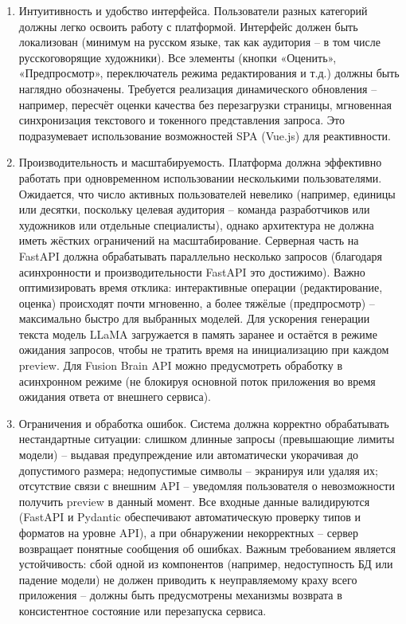 \begin{enumerate}[label=\arabic*.]
    \item Интуитивность и удобство интерфейса. Пользователи разных категорий должны легко освоить работу с платформой. Интерфейс должен быть локализован (минимум на русском языке, так как аудитория – в том числе русскоговорящие художники). Все элементы (кнопки «Оценить», «Предпросмотр», переключатель режима редактирования и т.д.) должны быть наглядно обозначены. Требуется реализация динамического обновления – например, пересчёт оценки качества без перезагрузки страницы, мгновенная синхронизация текстового и токенного представления запроса. Это подразумевает использование возможностей SPA (Vue.js) для реактивности.
    \item  Производительность и масштабируемость. Платформа должна эффективно работать при одновременном использовании несколькими пользователями. Ожидается, что число активных пользователей невелико (например, единицы или десятки, поскольку целевая аудитория – команда разработчиков или художников или отдельные специалисты), однако архитектура не должна иметь жёстких ограничений на масштабирование. Серверная часть на FastAPI должна обрабатывать параллельно несколько запросов (благодаря асинхронности и производительности FastAPI это достижимо)\cite{fastapi:practicum}. Важно оптимизировать время отклика: интерактивные операции (редактирование, оценка) происходят почти мгновенно, а более тяжёлые (предпросмотр) – максимально быстро для выбранных моделей. Для ускорения генерации текста модель LLaMA загружается в память заранее и остаётся в режиме ожидания запросов, чтобы не тратить время на инициализацию при каждом preview. Для Fusion Brain API можно предусмотреть обработку в асинхронном режиме (не блокируя основной поток приложения во время ожидания ответа от внешнего сервиса).
    \item Ограничения и обработка ошибок. Система должна корректно обрабатывать нестандартные ситуации: слишком длинные запросы (превышающие лимиты модели) – выдавая предупреждение или автоматически укорачивая до допустимого размера; недопустимые символы – экранируя или удаляя их; отсутствие связи с внешним API – уведомляя пользователя о невозможности получить preview в данный момент. Все входные данные валидируются (FastAPI и Pydantic обеспечивают автоматическую проверку типов и форматов на уровне API\cite{yandex:fastapi}), а при обнаружении некорректных – сервер возвращает понятные сообщения об ошибках. Важным требованием является устойчивость: сбой одной из компонентов (например, недоступность БД или падение модели) не должен приводить к неуправляемому краху всего приложения – должны быть предусмотрены механизмы возврата в консистентное состояние или перезапуска сервиса.

\end{enumerate}

